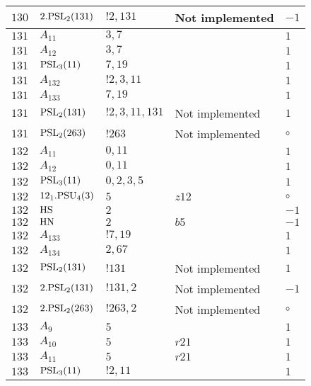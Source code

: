 \documentclass[a4paper, 11pt]{article}
\begin{document}
\begin{longtable}{lllll}
        $ 130 $ & $ 2.{\rm PSL}_{2}(131) $ & $ !2, 131 $ &  Not implemented & $ -1$ \\ \hline
        $ 131 $ & $ A_{11} $ & $ 3,7 $ & $ ~ $ & $ 1$ \\ \hline
        $ 131 $ & $ A_{12} $ & $ 3,7 $ & $ ~ $ & $ 1$ \\ \hline
        $ 131 $ & $ {\rm PSL}_{3}(11) $ & $ 7,19 $ & $ ~ $ & $ 1$ \\ \hline
        $ 131 $ & $ A_{132} $ & $ !2, 3, 11 $ & $ ~ $ & $ 1$ \\ \hline
        $ 131 $ & $ A_{133} $ & $ 7, 19 $ & $ ~ $ & $ 1$ \\ \hline
        $ 131 $ & $ {\rm PSL}_{2}(131) $ & $ !2, 3, 11, 131 $ &  Not implemented & $ 1$ \\ \hline
        $ 131 $ & $ {\rm PSL}_{2}(263) $ & $ !263 $ &  Not implemented &  $\circ$ \\ \hline
        $ 132 $ & $ A_{11} $ & $ 0,11 $ & $ ~ $ & $ 1$ \\ \hline
        $ 132 $ & $ A_{12} $ & $ 0,11 $ & $ ~ $ & $ 1$ \\ \hline
        $ 132 $ & $ {\rm PSL}_{3}(11) $ & $ 0,2,3,5 $ & $ ~ $ & $ 1$ \\ \hline
        $ 132 $ & $ 12_1.{\rm PSU}_{4}(3) $ & $ 5 $ & $ z12 $ &  $\circ$ \\ \hline
        $ 132 $ & $ {\rm HS} $ & $ 2 $ & $ ~ $ & $ -1$ \\ \hline
        $ 132 $ & $ {\rm HN} $ & $ 2 $ & $ b5 $ & $ -1$ \\ \hline
        $ 132 $ & $ A_{133} $ & $ !7, 19 $ & $ ~ $ & $ 1$ \\ \hline
        $ 132 $ & $ A_{134} $ & $ 2, 67 $ & $ ~ $ & $ 1$ \\ \hline
        $ 132 $ & $ {\rm PSL}_{2}(131) $ & $ !131 $ &  Not implemented & $ 1$ \\ \hline
        $ 132 $ & $ 2.{\rm PSL}_{2}(131) $ & $ !131, 2 $ &  Not implemented & $ -1$ \\ \hline
        $ 132 $ & $ 2.{\rm PSL}_{2}(263) $ & $ !263, 2 $ &  Not implemented &  $\circ$ \\ \hline
        $ 133 $ & $ A_{9} $ & $ 5 $ & $ ~ $ & $ 1$ \\ \hline
        $ 133 $ & $ A_{10} $ & $ 5 $ & $ r21 $ & $ 1$ \\ \hline
        $ 133 $ & $ A_{11} $ & $ 5 $ & $ r21 $ & $ 1$ \\ \hline
        $ 133 $ & $ {\rm PSL}_{3}(11) $ & $ ! 2,11 $ & $ ~ $ & $ 1$ \\ \hline

\end{longtable}
\end{document}

